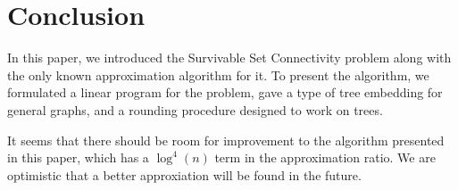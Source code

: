 \documentclass[12pt]{article}
\begin{document}
\section{Conclusion}

In this paper, we introduced the Survivable Set Connectivity problem along with the only known approximation algorithm for it. To present the algorithm, we formulated a linear program for the problem, gave a type of tree embedding for general graphs, and a rounding procedure designed to work on trees.

It seems that there should be room for improvement to the algorithm presented in this paper, which has a $\log^4(n)$ term in the approximation ratio. We are optimistic that a better approxiation will be found in the future.

%
%
%
%
%
\end{document}
